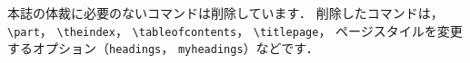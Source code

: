 \documentclass[technicalreport]{ieicej}
\begin{document}
\appendix
%
%
%
%
%

%
%

本誌の体裁に必要のないコマンドは削除しています．
削除したコマンドは，\verb/\part/，\allowbreak
\verb/\theindex/，\allowbreak
\verb/\tableofcontents/，\allowbreak
\verb/\titlepage/，\allowbreak
ページスタイルを変更するオプション（\texttt{headings}，
\texttt{myheadings}）などです．
\end{document}
